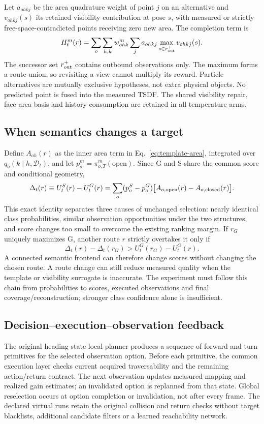 Let $a_{ohkj}$ be the area quadrature weight of point $j$ on an alternative and $v_{ohkj}(s)$ its retained visibility contribution at pose $s$, with measured or strictly free-space-contradicted points receiving zero new area. The completion term is
\begin{equation}
H_t^m(r)=\sum_o\sum_{h,k}w_{ohk}^m
\sum_j a_{ohkj}\max_{s\in r_{\rm out}^{+}}v_{ohkj}(s).
\label{eq:template-area}
\end{equation}
The successor set $r_{\rm out}^{+}$ contains outbound observations only. The maximum forms a route union, so revisiting a view cannot multiply its reward. Particle alternatives are mutually exclusive hypotheses, not extra physical objects. No predicted point is fused into the measured TSDF. The shared visibility repair, face-area basis and history consumption are retained in all temperature arms.

\subsection{When semantics changes a target}
Define $A_{oh}(r)$ as the inner area term in Eq.~\ref{eq:template-area}, integrated over $q_o(k\mid h,\mathcal D_t)$, and let $p_o^m=\pi_{o,T}^m(\text{open})$. Since G and S share the common score and conditional geometry,
\begin{equation}
\Delta_t(r)\equiv U_t^S(r)-U_t^G(r)
=\sum_o (p_o^S-p_o^G)\big[A_{o,\rm open}(r)-A_{o,\rm closed}(r)\big].
\label{eq:semantic-transfer}
\end{equation}
This exact identity separates three causes of unchanged selection: nearly identical class probabilities, similar observation opportunities under the two structures, and score changes too small to overcome the existing ranking margin. If $r_G$ uniquely maximizes G, another route $r$ strictly overtakes it only if
\begin{equation}
\Delta_t(r)-\Delta_t(r_G)>U_t^G(r_G)-U_t^G(r).
\end{equation}
A connected semantic frontend can therefore change scores without changing the chosen route. A route change can still reduce measured quality when the template or visibility surrogate is inaccurate. The experiment must follow this chain from probabilities to scores, executed observations and final coverage/reconstruction; stronger class confidence alone is insufficient.

\subsection{Decision--execution--observation feedback}
The original heading-state local planner produces a sequence of forward and turn primitives for the selected observation option. Before each primitive, the common execution layer checks current acquired traversability and the remaining action/return contract. The next observation updates measured mapping and realized gain estimates; an invalidated option is replanned from that state. Global reselection occurs at option completion or invalidation, not after every frame. The declared virtual runs retain the original collision and return checks without target blacklists, additional candidate filters or a learned reachability network.

